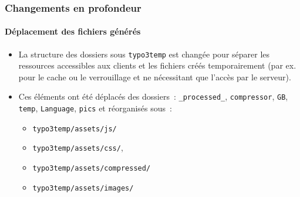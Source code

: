 \begin{frame}[fragile]
	\frametitle{Changements en profondeur}
	\framesubtitle{Déplacement des fichiers générés}

	\lstset{basicstyle=\tiny\ttfamily}

	\begin{itemize}

		\item La structure des dossiers sous \texttt{typo3temp} est changée pour séparer
			les ressources accessibles aux clients et les fichiers créés temporairement
			(par ex. pour le cache ou le verrouillage et ne nécessitant que l'accès par le serveur).

		\item Ces éléments ont été déplacés des dossiers~:\newline
			\texttt{\_processed\_}, \texttt{compressor}, \texttt{GB}, \texttt{temp},
			\texttt{Language}, \texttt{pics}\newline
			et réorganisés sous~:

			\begin{itemize}
				\item \texttt{typo3temp/assets/js/}
				\item \texttt{typo3temp/assets/css/},
				\item \texttt{typo3temp/assets/compressed/}
				\item \texttt{typo3temp/assets/images/}
			\end{itemize}

	\end{itemize}

\end{frame}

